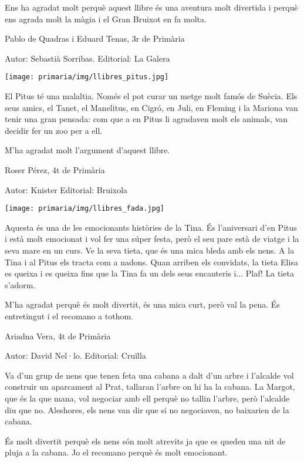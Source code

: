 \begin{shortnews}
{Ens ha agradat molt perquè aquest llibre és una aventura molt divertida i perquè ens agrada molt la màgia i el Gran Bruixot en fa molta.

 Pablo de Quadras i Eduard Tenas,  3r de Primària
}


{
Autor: 	Sebastià Sorribas.  Editorial: La Galera

\noindent\texttt{[image: primaria/img/llibres\_pitus.jpg]}

El Pitus té una malaltia. Només el pot curar un metge molt famós de Suècia. Els seus amics, el Tanet, el Manelitus, en Cigró, en Juli, en Fleming i la Mariona van tenir una gran pensada: com que a en Pitus li agradaven molt els animals, van decidir fer un zoo per a ell.

M’ha agradat molt l’argument d’aquest  llibre.

Roser Pérez, 4t de Primària
}

{
Autor: Knister   Editorial: Bruixola

\noindent\texttt{[image: primaria/img/llibres\_fada.jpg]}

Aquesta és una de les emocionants històries de la Tina. És l’aniversari d’en Pitus i està molt emocionat i vol fer una súper festa, però el seu pare està de viatge i la seva mare en un curs. Ve la seva tieta, que és una mica bleda  amb els nens. A la Tina i al Pitus els tracta com a nadons. Quan arriben els convidats, la tieta Elisa es queixa i es queixa fins que la Tina fa un dels seus encanteris i... Plaf! La tieta s’adorm.

M’ha agradat perquè és molt divertit, és una mica curt, però val la pena. És entretingut i el recomano a tothom.

Ariadna Vera, 4t de Primària
}

{
Autor: David Nel·lo.   Editorial: Cruïlla

Va d’un grup de nens que tenen feta una cabana a dalt d’un arbre i l’alcalde vol construir un aparcament al Prat, tallaran l’arbre on hi ha la cabana. La Margot, que és la que mana, vol negociar amb ell perquè no tallin l’arbre, però l’alcalde diu que no. Aleshores, els nens van dir que si no negociaven, no baixarien de la cabana. 

És molt divertit perquè els nens són molt atrevits ja que es queden una nit de pluja a la cabana. Jo el recomano perquè és molt emocionant.

}
\end{shortnews}
